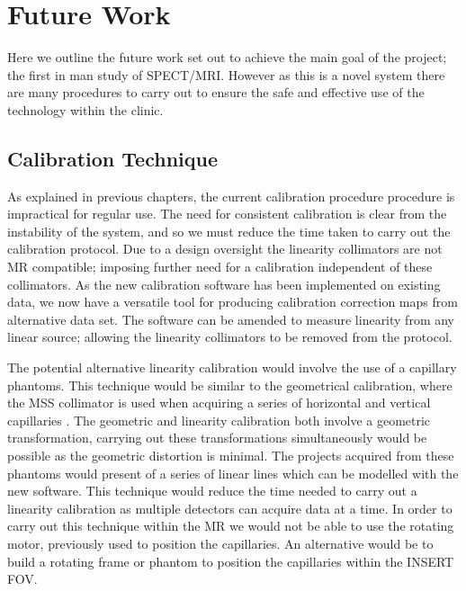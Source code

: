 \chapter{Future Work}
\label{Future}



Here we outline the future work set out to achieve the main goal of the project; the first in man study of \acrshort{SPECT/MRI}. However as this is a novel system there are many procedures to carry out to ensure the safe and effective use of the technology within the clinic.
\section{Calibration Technique}
As explained in previous chapters, the current calibration procedure procedure is impractical for regular use. The need for consistent calibration is clear from the instability of the system, and so we must reduce the time taken to carry out the calibration protocol. Due to a design oversight the linearity collimators are not \acrshort{MR} compatible; imposing further need for a calibration independent of these collimators. As the new calibration software has been implemented on existing data, we now have a versatile tool for producing calibration correction maps from alternative data set. The software can be amended to measure linearity from any linear source; allowing the linearity collimators to be removed from the protocol. 

The potential alternative linearity calibration would involve the use of a capillary phantoms. This technique would be similar to the geometrical calibration, where the \acrshort{MSS} collimator is used when acquiring a series of horizontal and vertical capillaries \cite{Smith1988AcquisitionAnalysis}. The geometric and linearity calibration both involve a geometric transformation, carrying out these transformations simultaneously would be possible as the geometric distortion is minimal. The projects acquired from these phantoms would present of a series of linear lines which can be modelled with the new software. This technique would reduce the time needed to carry out a linearity calibration as multiple detectors can acquire data at a time. In order to carry out this technique within the \acrshort{MR} we would not be able to use the rotating motor, previously used to position the capillaries. An alternative would be to build a rotating frame or phantom to position the capillaries within the \acrshort{INSERT} \acrshort{FOV}.

